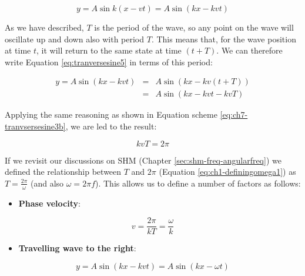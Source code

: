 \documentclass[
]{book}
\providecommand{\tightlist}{%
  \setlength{\itemsep}{0pt}\setlength{\parskip}{0pt}}
\begin{document}
\begin{equation}
y = A \sin k(x - vt) = A \sin (kx - kvt)
\label{eq:tranversesine5}
\end{equation}

As we have described, \(T\) is the period of the wave, so any point on the wave will oscillate up and down also with period \(T\). This means that, for the wave position at time \(t\), it will return to the same state at time \((t+T)\). We can therefore write Equation \eqref{eq:tranversesine5} in terms of this period:

\begin{equation}
\begin{array}{rcl}
y = A \sin \left( kx - kvt \right) &=& A \sin \left( kx - kv(t+T) \right) \\
&=& A \sin \left( kx - kvt - kvT \right)
\end{array}
\label{eq:ch7-travelling2}
\end{equation}

Applying the same reasoning as shown in Equation scheme \eqref{eq:ch7-tranvsersesine3b}, we are led to the result:

\begin{equation}
kvT = 2\pi
\end{equation}

If we revisit our discussions on SHM (Chapter \ref{sec:shm-freq-angularfreq}) we defined the relationship between \(T\) and \(2\pi\) (Equation \eqref{eq:ch1-definingomega1}) as \(T = \frac{2\pi}{\omega}\) (and also \(\omega = 2\pi f\)). This allows us to define a number of factors as follows:

\begin{itemize}
\tightlist
\item
  \textbf{Phase velocity}:
\end{itemize}

\begin{equation}
v = \frac{2\pi}{kT} = \frac{\omega}{k}
\label{eq:ch7-phasevel1}
\end{equation}

\begin{itemize}
\tightlist
\item
  \textbf{Travelling wave to the right}:
\end{itemize}

\begin{equation}
y = A \sin \left( kx - kvt \right) = A \sin \left( kx - \omega t \right)
\label{eq:ch7-travellingtoright1}
\end{equation}
\end{document}
